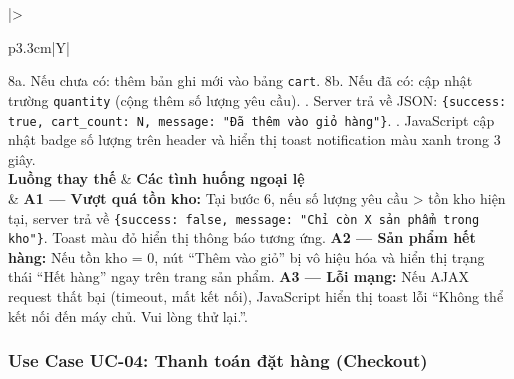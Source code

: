 \documentclass[11pt, a4paper]{article}
\begin{document}
\begin{table}[H]
\begin{tabularx}{\linewidth}{|>{\raggedright\arraybackslash}p{3.3cm}|Y|}
          8a. Nếu chưa có: thêm bản ghi mới vào bảng \texttt{cart}. \newline
          8b. Nếu đã có: cập nhật trường \texttt{quantity} (cộng thêm số lượng yêu cầu). . Server trả về JSON: \texttt{\{success: true, cart\_count: N, message: "Đã thêm vào giỏ hàng"\}}. . JavaScript cập nhật badge số lượng trên header và hiển thị toast notification màu xanh trong 3 giây. \\ \hline
        \textbf{Luồng thay thế} & \textbf{Các tình huống ngoại lệ} \\ \hline
        & \textbf{A1 --- Vượt quá tồn kho:} Tại bước 6, nếu số lượng yêu cầu > tồn kho hiện tại, server trả về \texttt{\{success: false, message: "Chỉ còn X sản phẩm trong kho"\}}. Toast màu đỏ hiển thị thông báo tương ứng. \newline
          \textbf{A2 --- Sản phẩm hết hàng:} Nếu tồn kho = 0, nút ``Thêm vào giỏ'' bị vô hiệu hóa và hiển thị trạng thái ``Hết hàng'' ngay trên trang sản phẩm. \newline
          \textbf{A3 --- Lỗi mạng:} Nếu AJAX request thất bại (timeout, mất kết nối), JavaScript hiển thị toast lỗi ``Không thể kết nối đến máy chủ. Vui lòng thử lại.''. \\ \hline
    \end{tabularx}
\end{table}
\subsubsection{Use Case UC-04: Thanh toán đặt hàng (Checkout)}
\end{document}
